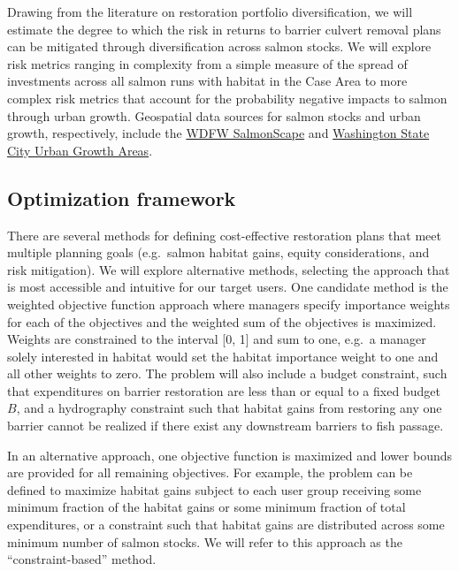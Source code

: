 Drawing from the literature on restoration portfolio diversification, we will estimate the degree to which the risk in returns to barrier culvert removal plans can be mitigated through diversification across salmon stocks. We will explore risk metrics ranging in complexity from a simple measure of the spread of investments across all salmon runs with habitat in the Case Area to more complex risk metrics that account for the probability negative impacts to salmon through urban growth. Geospatial data sources for salmon stocks and urban growth, respectively, include the \href{https://apps.wdfw.wa.gov/salmonscape/}{WDFW SalmonScape} and \href{https://geo.wa.gov/datasets/wa-geoservices::washington-state-city-urban-growth-areas/about}{Washington State City Urban Growth Areas}.


\subsection*{Optimization framework \label{sec:opt}}

There are several methods for defining cost-effective restoration plans that meet multiple planning goals (e.g.\ salmon habitat gains, equity considerations, and risk mitigation). We will explore alternative methods, selecting the approach that is most accessible and intuitive for our target users. One candidate method is the weighted objective function approach where managers specify importance weights for each of the objectives and the weighted sum of the objectives is maximized. Weights are constrained to the interval [0, 1] and sum to one, e.g.\ a manager solely interested in habitat would set the habitat importance weight to one and all other weights to zero. The problem will also include a budget constraint, such that expenditures on barrier restoration are less than or equal to a fixed budget $B$, and a hydrography constraint such that habitat gains from restoring any one barrier cannot be realized if there exist any downstream barriers to fish passage. 

In an alternative approach, one objective function is maximized and lower bounds are provided for all remaining objectives. For example, the problem can be defined to maximize habitat gains subject to each user group receiving some minimum fraction of the habitat gains or some minimum fraction of total expenditures, or a constraint such that habitat gains are distributed across some minimum number of salmon stocks. We will refer to this approach as the ``constraint-based'' method.

